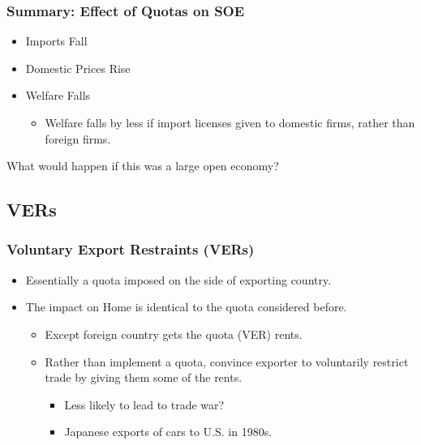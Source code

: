 \documentclass{beamer}
\begin{document}
\begin{frame}
	\frametitle{Summary: Effect of Quotas on SOE}
	
	\begin{itemize}
		\item Imports Fall
		\item Domestic Prices Rise
		\item Welfare Falls
		\begin{itemize}
			\item Welfare falls by less if import licenses given to domestic firms, rather than foreign firms.
		\end{itemize}
	\end{itemize}
	
	\begin{center}
		What would happen if this was a large open economy? 
	\end{center}
	
\end{frame}

\subsection{VERs}

\begin{frame}
	\frametitle{Voluntary Export Restraints (VERs)}
	\begin{itemize}
		\item Essentially a quota imposed on the side of exporting country.
		\item The impact on Home is identical to the quota considered before.
		\begin{itemize}
			\item Except foreign country gets the quota (VER) rents.
			\item Rather than implement a quota, convince exporter to voluntarily restrict trade by giving them some of the rents.
			\begin{itemize}
				\item Less likely to lead to trade war?
				\item Japanese exports of cars to U.S. in 1980s.
			\end{itemize}
		\end{itemize}
	\end{itemize}
	
	
\end{frame}
\end{document}
